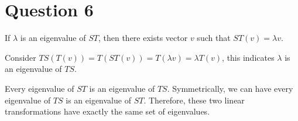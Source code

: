 \section*{Question 6}
If $ \lambda $ is an eigenvalue of $ ST $, then there exists vector $ v $ such that $ ST(v) = \lambda v $.

Consider $ TS(T(v)) = T(ST(v)) = T(\lambda v) = \lambda T(v) $, this indicates $ \lambda $ is an eigenvalue of $ TS $.

Every eigenvalue of $ ST $ is an eigenvalue of $ TS $. Symmetrically, we can have every eigenvalue of $ TS $ is an eigenvalue of $ ST $. Therefore, these two linear transformations have exactly the same set of eigenvalues.